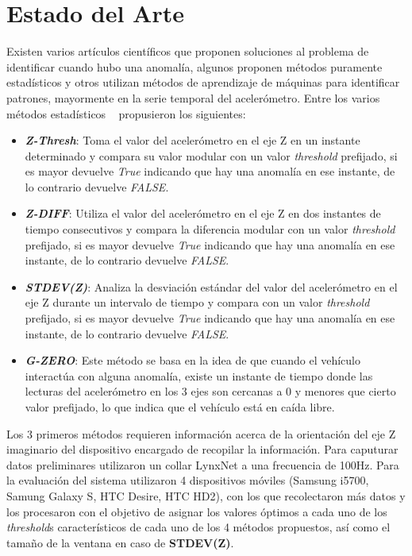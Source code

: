 \chapter{Estado del Arte}\label{chapter:state-of-the-art}

Existen varios artículos científicos que proponen soluciones al problema de identificar cuando hubo una anomalía, algunos proponen métodos
puramente estadísticos y otros utilizan métodos de aprendizaje de máquinas para identificar patrones, mayormente en la serie temporal del
acelerómetro. Entre los varios métodos estadísticos ~\cite{mednis2011real} propusieron los siguientes:\\

\begin{itemize}
	\item  \emph{\textbf {Z-Thresh}}: Toma el valor del acelerómetro en el eje Z en un instante determinado y compara su valor modular con 
	un valor \emph{threshold} prefijado, si es mayor devuelve \emph{True} indicando que hay una anomalía en ese instante, de lo contrario
	devuelve {\it FALSE}.\\
	\item \emph{\textbf {Z-DIFF}}: Utiliza el valor del acelerómetro en el eje Z en dos instantes de tiempo consecutivos y compara la
		diferencia modular con un valor \emph{threshold} prefijado, si es mayor devuelve \emph{True} indicando que hay una anomalía en ese
		instante, de lo contrario devuelve {\it FALSE}.\\
	\item \emph{\textbf {STDEV(Z)}}: Analiza la desviación estándar del valor del acelerómetro en el eje Z durante un intervalo de
		tiempo y compara con un valor \emph{threshold} prefijado, si es mayor devuelve \emph{True} indicando que hay una anomalía en ese
		instante, de lo contrario devuelve {\it FALSE}.\\ 
	\item \emph{\textbf {G-ZERO}}: Este método se basa en la idea de que cuando el vehículo interactúa con alguna anomalía, existe un
		instante de tiempo donde las lecturas del acelerómetro en los 3 ejes son cercanas a 0 y menores que cierto valor prefijado, lo que
		indica que el vehículo está en caída libre.\\
\end{itemize}

Los 3 primeros métodos requieren información acerca de la orientación del eje Z imaginario del dispositivo encargado de recopilar la información. 
Para caputurar datos preliminares utilizaron un collar LynxNet a una frecuencia de 100Hz. Para la evaluación del sistema utilizaron 4 dispositivos
móviles (Samsung i5700, Samung Galaxy S, HTC Desire, HTC HD2), con los que recolectaron más datos y los procesaron con el objetivo de asignar los 
valores óptimos a cada uno de los \emph{threshold}s característicos de cada uno de los 4 métodos propuestos, así como el tamaño de la ventana en caso de 
\textbf {STDEV(Z)}.\\

